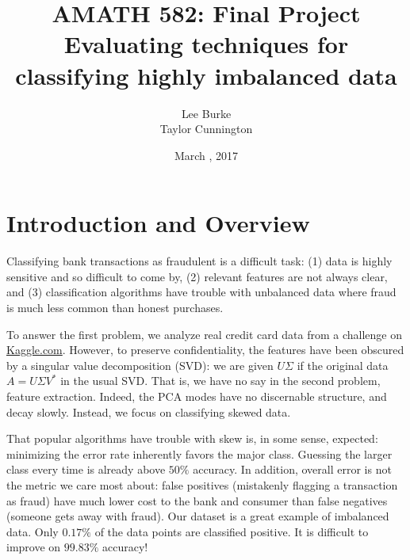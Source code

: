 \documentclass{article}
\title{
AMATH 582: Final Project\\
\Large Evaluating techniques for classifying highly imbalanced data}
\date{March \nth{16}, 2017}
\author{Lee Burke \\ Taylor Cunnington}
\begin{document}
\maketitle
{}
\section{Introduction and Overview}
Classifying bank transactions as fraudulent is a difficult task: (1) data is highly sensitive and so difficult to come by, (2) relevant features are not always clear, and (3) classification algorithms have trouble with unbalanced data where fraud is much less common than honest purchases.

To answer the first problem, we analyze real credit card data from a challenge on \href{kaggle.com}{Kaggle.com}. However, to preserve confidentiality, the features have been obscured by a singular value decomposition (SVD): we are given $U\Sigma$ if the original data $A=U\Sigma V^\ast$ in the usual SVD. That is, we have no say in the second problem, feature extraction. Indeed, the PCA modes have no discernable structure, and decay slowly. Instead, we focus on classifying skewed data.

That popular algorithms have trouble with skew is, in some sense, expected: minimizing the error rate inherently favors the major class. Guessing the larger class every time is already above $50\%$ accuracy. In addition, overall error is not the metric we care most about: false positives (mistakenly flagging a transaction as fraud) have much lower cost to the bank and consumer than false negatives (someone gets away with fraud). Our dataset is a great example of imbalanced data. Only $0.17\%$ of the data points are classified positive. It is difficult to improve on $99.83\%$ accuracy!
\end{document}
